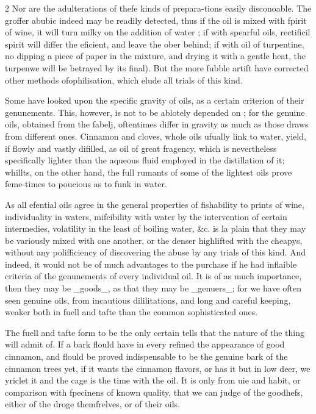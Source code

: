\documentclass[10pt]{article}
\begin{document}
\begin{multicols}{2}
Nor are the adulterations of thefe kinds of prepara-tions easily disconoable. The groffer abubic indeed may be readily detected, thus if the oil is mixed with fpirit of wine, it will turn milky on the addition of water ; if with spearful oils, rectificil spirit will differ the eficient, and leave the ober behind; if with oil of turpentine, no dipping a piece of paper in the mixture, and drying it with a gentle heat, the turpenwe will be betrayed by its final). But the more fubble artift have corrected other methods ofophilisation, which elude all trials of this kind.

Some have looked upon the specific gravity of oils, as a certain criterion of their genunements. This, however, is not to be ablotely depended on ; for the genuine oils, obtained from the fabelj, oftentimes differ in gravity as much as those draws from different ones. Cinnamon and cloves, whole oils ufually link to water, yield, if flowly and vastly difilled, as oil of great fragency, which is nevertheless specifically lighter than the aqueous fluid employed in the distillation of it; whillts, on the other hand, the full rumants of some of the lightest oils prove feme-times to poucious as to funk in water.

As all efential oils agree in the general properties of fishability to prints of wine, individuality in waters, mifcibility with water by the intervention of certain intermedies, volatility in the least of boiling water, \&c. is la plain that they may be variously mixed with one another, or the denser highlifted with the cheapys, without any polifficiency of discovering the abuse by any trials of this kind. And indeed, it would not be of much advantages to the purchase if he had inflaible criteria of the genunements of every individual oil. It is of as much importance, then they may be \_goods\_, as that they may be \_genuers\_; for we have often seen genuine oils, from incautious dililitations, and long and careful keeping, weaker both in fuell and tafte than the common sophisticated ones.

The fuell and tafte form to be the only certain tells that the nature of the thing will admit of. If a bark flould have in every refined the appearance of good cinnamon, and flould be proved indispensable to be the genuine bark of the cinnamon trees yet, if it wants the cinnamon flavors, or has it but in low deer, we yriclet it and the cage is the time with the oil. It is only from uie and habit, or comparison with fpecinens of known quality, that we can judge of the goodhefs, either of the droge themfrelves, or of their oils.

\end{multicols}
\end{document}
